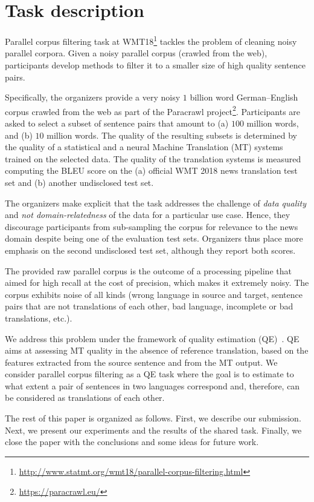 \section{Task description}

Parallel corpus filtering task at WMT18\footnote{\url{http://www.statmt.org/wmt18/parallel-corpus-filtering.html}} tackles the problem of cleaning noisy parallel corpora. Given a noisy parallel corpus (crawled from the web), participants develop methods to filter it to a smaller size of high quality sentence pairs.

Specifically, the organizers provide a very noisy $1$ billion word German--English corpus crawled from the web as part of the Paracrawl project\footnote{\url{https://paracrawl.eu/}}. Participants are asked to select a subset of sentence pairs that amount to (a) $100$ million words, and (b) $10$ million words. The quality of the resulting subsets is determined by the quality of a statistical and a neural Machine Translation (MT) systems trained on the selected data. The quality of the translation systems is measured computing the BLEU score on the (a) official WMT 2018 news translation test set and (b) another undisclosed test set.

The organizers make explicit that the task addresses the challenge of \emph{data quality} and \emph{not domain-relatedness} of the data for a particular use case. Hence, they discourage participants from sub-sampling the corpus for relevance to the news domain despite being one of the evaluation test sets. Organizers thus place more emphasis on the second undisclosed test set, although they report both scores.

The provided raw parallel corpus is the outcome of a processing pipeline that aimed for high recall at the cost of precision, which makes it extremely noisy. The corpus exhibits noise of all kinds (wrong language in source and target, sentence pairs that are not translations of each other, bad language, incomplete or bad translations, etc.).

We address this problem under the framework of quality estimation (QE)~\cite{Blatz04}. QE aims at assessing MT quality in the absence of reference translation, based on the features extracted from the source sentence and from the MT output. We consider parallel corpus filtering as a QE task where the goal is to estimate to what extent a pair of sentences in two languages correspond and, therefore, can be considered as translations of each other. 

The rest of this paper is organized as follows. First, we describe our submission. Next, we present our experiments and the results of the shared task. Finally, we close the paper with the conclusions and some ideas for future work.